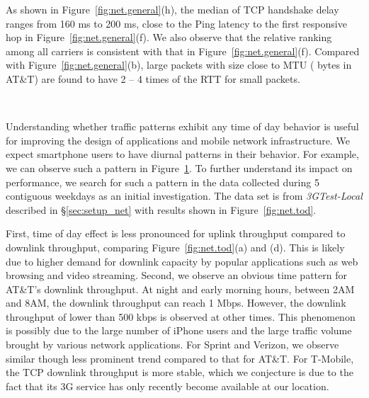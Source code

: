 As shown in Figure~\ref{fig:net.general}(h), the median of TCP handshake 
delay ranges from 160 ms to 200 ms, close to the Ping latency to the 
first responsive hop in Figure~\ref{fig:net.general}(f). We also observe 
that the relative ranking among all carriers is consistent with that 
in Figure~\ref{fig:net.general}(f). Compared with Figure~\ref{fig:net.general}(b), 
large packets with size close to MTU ( bytes in AT\&T) are 
found to have 2 -- 4 times of the RTT for small packets.

\begin{figure}[thb]
\centering
{} \\
\label{fig:net.uservstod}
\end{figure} 

\label{sec:net.tod}

Understanding whether traffic patterns exhibit any time of day
behavior is useful for improving the design of applications and mobile
network infrastructure. %
We expect smartphone users to have diurnal patterns in their behavior. 
For example, we can observe such a pattern in Figure~\ref{fig:net.uservstod}.
To further understand its impact on performance, we search for such a 
pattern in the data collected during 5 contiguous weekdays as an initial 
investigation. The data set is from \emph{3GTest-Local} described in
\S\ref{sec:setup_net} with results shown in Figure~\ref{fig:net.tod}. 

First, time of day effect is less pronounced for uplink throughput 
compared to downlink throughput, comparing Figure~\ref{fig:net.tod}(a) and (d).
This is likely due to higher demand 
for downlink capacity by popular applications such as web browsing 
and video streaming. Second, we observe an obvious time pattern for 
AT\&T's downlink throughput. At night and early morning hours, between 
2AM and 8AM, the downlink throughput can reach 1 Mbps. However, the 
downlink throughput of lower than 500 kbps is observed at other times. 
This phenomenon is possibly due to the large number of iPhone users 
and the large traffic volume brought by various network applications.
For Sprint and Verizon, we observe similar though less prominent trend 
compared to that for AT\&T. For T-Mobile, the TCP downlink throughput 
is more stable, which we conjecture is due to the fact that its 3G 
service has only recently become available at our location.


